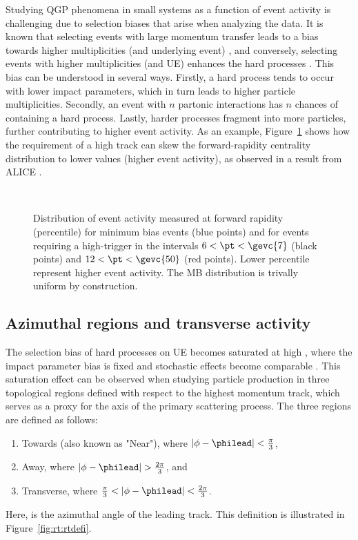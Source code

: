 Studying QGP phenomena in small systems as a function of event activity is challenging due to selection biases that arise when analyzing the data. It is known that selecting events with large momentum transfer leads to a bias towards higher multiplicities (and underlying event) \cite{alicecollaborationConstraintsJetQuenching2018}, and conversely, selecting events with higher multiplicities (and UE) enhances the hard processes \cite{alicecollaborationMultiplicityDependenceChargedparticle2022}. This bias can be understood in several ways. Firstly, a hard process tends to occur with lower impact parameters, which in turn leads to higher particle multiplicities. Secondly, an event with $n$ partonic interactions has $n$ chances of containing a hard process. Lastly, harder processes fragment into more particles, further contributing to higher event activity. As an example, Figure~\ref{fig:rt:hardbias} shows how the requirement of a high \pt track can skew the forward-rapidity centrality distribution to lower values (higher event activity), as observed in a result from ALICE \cite{alicecollaborationConstraintsJetQuenching2018}.

\begin{figure}%
\\
\caption{Distribution of event activity measured at forward rapidity (\VOA percentile) for minimum bias events (blue points) and for events requiring a high-\pt trigger in the intervals $6<\pt<\gevc{7}$ (black points) and $12<\pt<\gevc{50}$ (red points). Lower \VOA percentile represent higher event activity. The MB distribution is trivally uniform by construction. \cite{alicecollaborationConstraintsJetQuenching2018}}
\label{fig:rt:hardbias}
\end{figure}

\subsection{Azimuthal regions and transverse activity}

The selection bias of hard processes on UE becomes saturated at high \pt, where the impact parameter bias is fixed and stochastic effects become comparable \cite{acharyaUnderlyingEventProperties2020}. This saturation effect can be observed when studying particle production in three topological regions defined with respect to the highest momentum track, which serves as a proxy for the axis of the primary scattering process. The three regions are defined as follows:
\begin{enumerate}
\item Towards (also known as "Near"), where $|\phi - \philead| < \frac{\pi}{3}$,
\item Away, where $|\phi - \philead| > \frac{2\pi}{3}$, and 
\item Transverse, where $\frac{\pi}{3} < |\phi - \philead| < \frac{2\pi}{3}$. 
\end{enumerate}
Here, \philead is the azimuthal angle of the leading track. This definition is illustrated in Figure~\ref{fig:rt:rtdefi}. 

